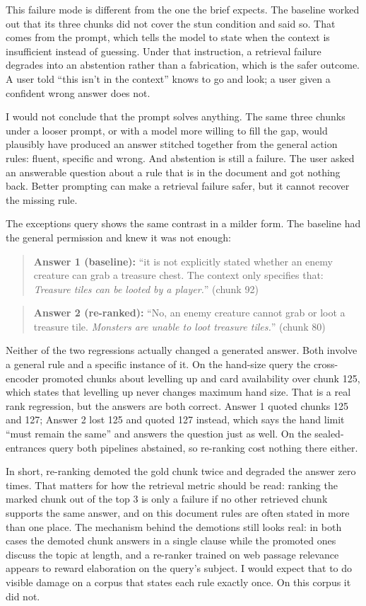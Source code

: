 \documentclass[11pt,a4paper]{article}
\begin{document}
This failure mode is different from the one the brief expects. The
baseline worked out that its three chunks did not cover the stun condition and said so. That
comes from the prompt, which tells the model to state when the context is insufficient
instead of guessing. Under that instruction, a retrieval failure degrades into an abstention
rather than a fabrication, which is the safer outcome. A user told ``this isn't in the
context'' knows to go and look; a user given a confident wrong answer does not.

I would not conclude that the prompt solves anything. The same three chunks under a looser
prompt, or with a model more willing to fill the gap, would plausibly have produced an answer
stitched together from the general action rules: fluent, specific and wrong. And abstention
is still a failure. The user asked an answerable question about a rule that is in the
document and got nothing back. Better prompting can make a retrieval failure safer, but it cannot recover the missing rule.

The exceptions query shows the same contrast in a milder form. The baseline had the general
permission and knew it was not enough:

\begin{quote}
\textbf{Answer 1 (baseline):} ``it is not explicitly stated whether an enemy creature can
grab a treasure chest. The context only specifies that: \emph{Treasure tiles can be looted
by a player.}'' (chunk 92)
\end{quote}

\begin{quote}
\textbf{Answer 2 (re-ranked):} ``No, an enemy creature cannot grab or loot a treasure tile.
\emph{Monsters are unable to loot treasure tiles.}'' (chunk 80)
\end{quote}

Neither of the two regressions actually changed a generated answer. Both involve a general rule and a specific instance of
it. On the hand-size query the cross-encoder promoted chunks about levelling up and card
availability over chunk 125, which states that levelling up never changes maximum hand size.
That is a real rank regression, but the answers are both correct. Answer 1 quoted chunks
125 and 127; Answer 2 lost 125 and quoted 127 instead, which says the hand limit ``must
remain the same'' and answers the question just as well. On the sealed-entrances query both
pipelines abstained, so re-ranking cost nothing there either.

In short, re-ranking demoted the gold chunk twice and degraded the
answer zero times. That matters for how the retrieval metric should be read: ranking the
marked chunk out of the top 3 is only a failure if no other retrieved chunk supports the
same answer, and on this document rules are often stated in more than one place. The
mechanism behind the demotions still looks real: in both cases the demoted chunk answers
in a single clause while the promoted ones discuss the topic at length, and a re-ranker
trained on web passage relevance appears to reward elaboration on the query's subject. I
would expect that to do visible damage on a corpus that states each rule exactly once. On
this corpus it did not.
\end{document}
